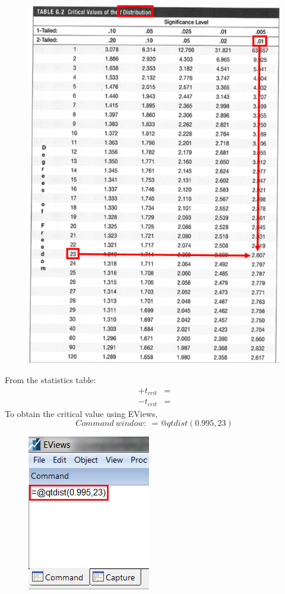 \documentclass[12pt]{report}
\begin{document}
\begin{figure}[H]
	\centering
	\includegraphics{tute6_q1_1}
\end{figure}
\vspace{-\baselineskip}
\noindent From the statistics table: \begin{align*}
+t_{crit} &=  \\
-t_{crit} &= 
\end{align*}
\noindent To obtain the critical value using EViews,
$$Command\ window:\ =@qtdist(0.995,23)$$
\begin{figure}[H]
	\centering
	\includegraphics{tute6_q1_2}
\end{figure}
\end{document}
